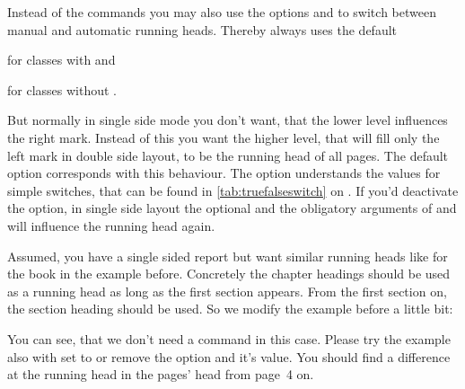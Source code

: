 Instead of the commands you may also use the options  and
 to switch between manual and automatic running
heads. Thereby  always uses the default
\begin{lstcode}[belowskip=\dp\strutbox]
\end{lstcode}
for classes with  and
\begin{lstcode}[belowskip=\dp\strutbox]
\end{lstcode}
for classes without .

But normally in single side mode you don't want, that the lower level
influences the right mark. Instead of this you want the higher level, that
will fill only the left mark in double side layout, to be the running head of
all pages. The default option  corresponds with this
behaviour. The option understands the values for simple switches, that can be
found in  \autoref{tab:truefalseswitch} on
. If you'd deactivate the option, in single
side layout the optional and the obligatory arguments of  and
 will influence the running head again.%
%
\begin{Example}
  Assumed, you have a single sided report but want similar running heads like
  for the book in the example before. Concretely the chapter headings should
  be used as a running head as long as the first section appears. From the
  first section on, the section heading should be used. So we modify the
  example before a little bit:
  You can see, that we don't need a  command in this
  case. Please try the example also with  set to
   or remove the option and it's value. You should find a
  difference at the running head in the pages' head from page~4 on.
\end{Example}

